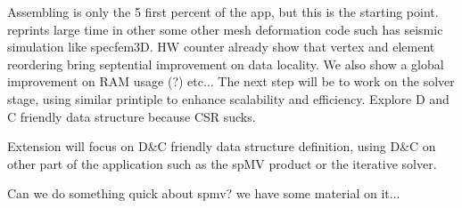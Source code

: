 \documentclass{IOS-Book-Article}
\begin{document}
Assembling is only the 5 first percent of the app, but this is the starting point. reprints large time in other some other mesh deformation code such has seismic
simulation like specfem3D.
HW counter already show that vertex and element reordering bring septential improvement on data locality. We also show a global improvement on RAM usage (?) etc...
The next step will be to work on the solver stage, using similar printiple to enhance scalability and efficiency. Explore D and C friendly data structure because CSR sucks.  

Extension will focus on D\&C friendly data structure definition, using D\&C on other part of the  application such as the spMV product or the iterative solver. 

Can we do something quick about spmv? we have some material on it...



\end{document}

